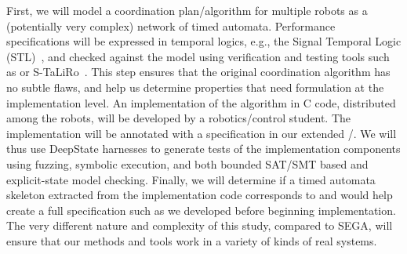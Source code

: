 First, we will model a coordination plan/algorithm for multiple robots as a (potentially very complex) network of timed automata.
Performance specifications will be expressed in temporal logics, e.g., the Signal Temporal Logic (STL)~\cite{donze2010robust}, and checked against the model using verification and testing tools such as \uppaal or S-TaLiRo~\cite{annpureddy2011s}.
This step ensures that the original coordination algorithm has no subtle flaws, and help us determine properties that need formulation at the implementation level.
An implementation of the algorithm in C code, distributed among the robots, will be developed by a robotics/control student.
The implementation will be annotated with a specification in our extended \acsl/\eacsl.
We will thus use DeepState harnesses to generate tests of the implementation components using fuzzing, symbolic execution, and both bounded SAT/SMT based and explicit-state model checking.  Finally, we will determine if a timed automata skeleton extracted from the implementation code corresponds to and would help create a full specification such as we developed before beginning implementation.
The very different nature and complexity of this study, compared to SEGA, will ensure that our methods and tools work in a variety of kinds of real systems.



